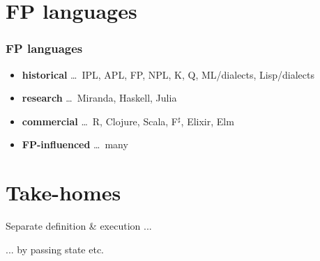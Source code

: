 \documentclass[xcolor={dvipsnames}]{beamer}
\begin{document}
\section{FP languages}

\begin{frame}[fragile]
  \frametitle{FP languages}
  \begin{itemize}
    \item \textbf{historical} \ldots\ IPL, APL, FP, NPL, K, Q, ML/dialects, Lisp/dialects
    \item \textbf{research} \ldots\ Miranda, Haskell, Julia
    \item \textbf{commercial} \ldots\ R, Clojure, Scala, F$^\sharp$, Elixir, Elm
    \item \textbf{FP-influenced} \ldots\ many
  \end{itemize}
\end{frame}

\section{Take-homes}

\begin{frame}
  Separate definition \& execution ...
  
  \hfill ... by passing state etc.
  
\end{frame}
\end{document}
